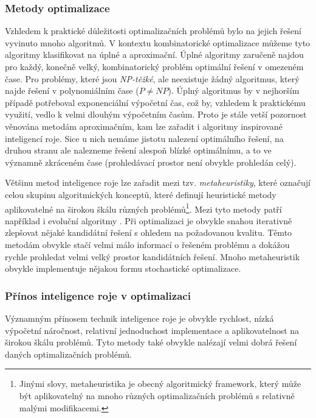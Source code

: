 \documentclass[a4paper,12pt]{article}
\begin{document}
\subsubsection{Metody optimalizace}
Vzhledem k praktické důležitosti optimalizačních problémů bylo na jejich řešení vyvinuto mnoho
algoritmů. V kontextu kombinatorické optimalizace můžeme tyto algoritmy klasifikovat na úplné a
aproximační. Úplné algoritmy zaručeně najdou pro každý, konečně velký, kombinatorický problém
optimální řešení v omezeném čase. Pro problémy, které jsou {\it NP-těžké}, ale neexistuje žádný
algoritmus, který najde řešení v polynomiálním čase ($P\neq NP$). Úplný algoritmus by v nejhorším
případě potřeboval exponenciální výpočetní čas, což by, vzhledem k praktickému využití, vedlo k
velmi dlouhým výpočetním časům. Proto je stále vetší pozornost věnována metodám aproximačním, kam
lze zařadit i algoritmy inspirované inteligencí roje. Sice u nich nemáme jistotu nalezení
optimálního řešení, na druhou stranu ale nalezneme řešení alespoň blízké optimálnímu, a to ve
významně zkráceném čase (prohledávací prostor není obvykle prohledán celý).

Většinu metod inteligence roje lze zařadit mezi tzv. {\it metaheuristiky}, které označují celou skupinu
algoritmických konceptů, které definují heuristické metody aplikovatelné na širokou škálu různých problémů\footnote{Jinými slovy, metaheuristika je obecný algoritmický framework, který může být aplikovatelný
na mnoho různých optimalizačních problémů s relativně malými modifikacemi.}.
Mezi tyto metody patří například i evoluční algoritmy \cite{Dorigo06antcolony}. Při optimalizaci je obvykle
snahou iterativně zlepšovat nějaké kandidátní řešení s ohledem na požadovanou kvalitu. Těmto
metodám obvykle stačí velmi málo informací o řešeném problému a dokážou rychle prohledat velmi
velký prostor kandidátních řešení. Mnoho metaheuristik obvykle implementuje nějakou formu stochastické
optimalizace.


\subsubsection{Přínos inteligence roje v optimalizaci}
Významným přínosem technik inteligence roje je obvykle rychlost, nízká
výpočetní náročnost, relativní jednoduchost implementace a aplikovatelnost na širokou škálu problémů.
Tyto metody také obvykle nalézají velmi dobrá řešení daných optimalizačních problémů.
\end{document}
